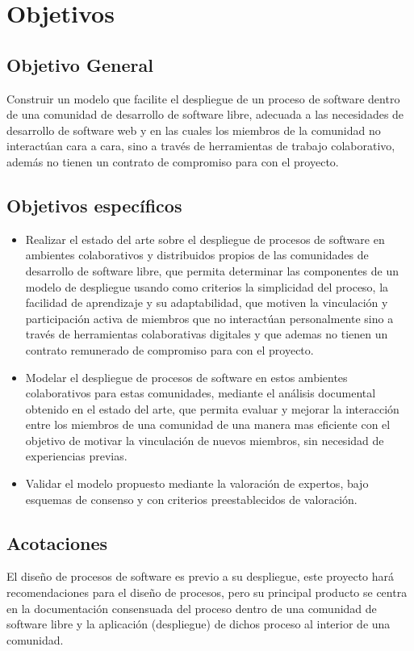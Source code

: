 \section{Objetivos}
\subsection{Objetivo General}
Construir un modelo que facilite el despliegue de un proceso  de software dentro de una comunidad de desarrollo de software libre, adecuada a las necesidades de desarrollo de software web y en las cuales los miembros de la comunidad no interactúan cara a cara, sino a través de herramientas de trabajo colaborativo, además no tienen un contrato de compromiso para con el proyecto.

\subsection{Objetivos específicos}

\begin{itemize}
	\item Realizar el estado del arte sobre el despliegue de procesos de software en ambientes colaborativos y distribuidos propios de las comunidades de desarrollo de software libre, que permita determinar las componentes de un modelo de despliegue usando como criterios la simplicidad del proceso, la facilidad de aprendizaje y su adaptabilidad, que motiven la vinculación y participación activa de miembros que no interactúan personalmente sino a través de herramientas colaborativas digitales y que ademas no tienen un contrato remunerado de compromiso para con el proyecto.
	\item Modelar el despliegue de procesos de software en estos ambientes colaborativos para estas comunidades, mediante el análisis documental obtenido en el estado del arte, que permita evaluar y mejorar la interacción entre los miembros de una comunidad de una manera mas eficiente con el objetivo de motivar la vinculación de nuevos miembros, sin necesidad de experiencias previas.
	\item Validar el modelo propuesto mediante la valoración de expertos, bajo esquemas de consenso y con criterios preestablecidos de valoración.
\end{itemize} 
	
 
\subsection{Acotaciones}
El diseño de procesos de software es previo a su despliegue, este proyecto hará recomendaciones para el diseño de procesos, pero su principal producto se centra en la documentación consensuada del proceso dentro de una comunidad de software libre y la aplicación (despliegue) de dichos proceso al interior de una comunidad.

